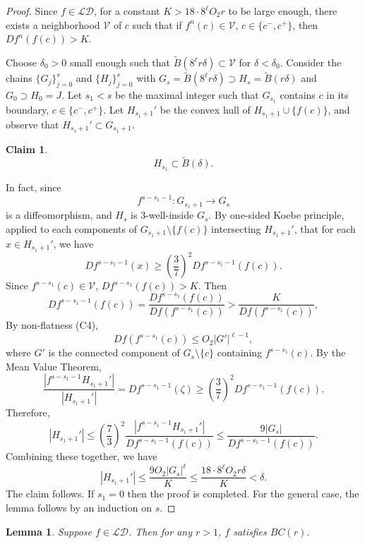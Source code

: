 \documentclass[11pt,oneside]{article}
\newtheorem*{claim}{Claim}
\theoremstyle{plain}
\newtheorem{lem}{Lemma}[section]
\numberwithin{equation}{section}
\numberwithin{figure}{section}
\numberwithin{table}{section}
\begin{document}
\begin{proof}

Since $f \in \mathcal {LD}$, for a constant $K > 18 \cdot 8^{\ell} O_2 r$ to be large enough, there exists a neighborhood $\mathcal V$ of $c$ such that if $f^n(c) \in \mathcal V$, $c \in \{c^-, c^+ \}$, then $Df^n(f(c)) > K$.


Choose $\delta_0>0$ small enough such that $\tilde B(8^{\ell}r \delta) \subset \mathcal V$ for $\delta < \delta_0$. Consider the chains $\{G_j \}_{j=0}^s$ and $\{H_j \}_{j=0}^s$ with $G_s = \tilde B(8^{\ell}r \delta) \supset H_s = \tilde B(r \delta)$ and $G_0 \supset H_0 =J$. Let $s_1 < s$ be the maximal integer such that $G_{s_1}$ contains $c$ in its boundary, $c \in \{c^-, c^+ \}$. Let $H_{s_1+1}'$ be the convex hull of $H_{s_1 + 1} \cup \{ f(c)\}$, and observe that $H_{s_1+1}' \subset G_{s_1+1}$.


\begin{claim}
\[
H_{s_1} \subset \tilde B(\delta).
\]
\end{claim}


In fact, since 
\[
f^{s-s_1-1} : G_{s_1 +1} \to G_s
\]
is a diffeomorphism, and $H_s$ is $3$-well-inside $G_s$. By one-sided Koebe principle, applied to each components of $G_{s_1+1} \setminus \{ f(c) \}$ intersecting $H_{s_1+1}'$, that for each $x \in H_{s_1+1}'$, we have
\[
D f^{s-s_1-1} (x) \geq \left(\frac{3}{7}\right)^2 D f^{s-s_1-1} (f(c)).
\]
Since $f^{s-s_1}(c) \in \mathcal V$, $Df^{s-s_1}(f(c)) > K$. Then
\[
D f^{s-s_1-1} (f(c)) = \frac{D f^{s-s_1}(f(c))}{Df(f^{s-s_1}(c))} > \frac{K}{Df(f^{s-s_1}(c))},
\]
By non-flatness (C4), 
\[
Df(f^{s-s_1}(c)) \leq O_2 |G'|^{\ell -1},
\]
where $G'$ is the connected component of $G_s \setminus \{ c \}$ containing $f^{s-s_1}(c)$. By the Mean Value Theorem, 
\[
\frac{|f^{s-s_1-1}H_{s_1+1}'|}{|H_{s_1+1}'|} = D f^{s-s_1-1} (\zeta) \geq \left(\frac{3}{7}\right)^2 D f^{s-s_1-1} (f(c)).
\]
Therefore,
\[
|H_{s_1+1}'| \leq \left(\frac{7}{3}\right)^2 \frac{|f^{s-s_1-1}H_{s_1+1}'|}{D f^{s-s_1-1} (f(c))} \leq \frac{9 |G_s|}{D f^{s-s_1-1} (f(c))}.
\]
 Combining these together, we have
\[
|H_{s_1+1}'| \leq \frac{9 O_2 |G_s|^{\ell}}{K} \leq \frac{18 \cdot 8^{\ell} O_2 r \delta}{K} < \delta.
\]
The claim follows. If $s_1= 0$ then the proof is completed. For the general case, the lemma follows by an induction on $s$.


\end{proof}



\begin{lem}
Suppose $f \in \mathcal {LD}$. Then for any $r>1$, $f$ satisfies $BC(r)$. 
\end{lem}
\end{document}
